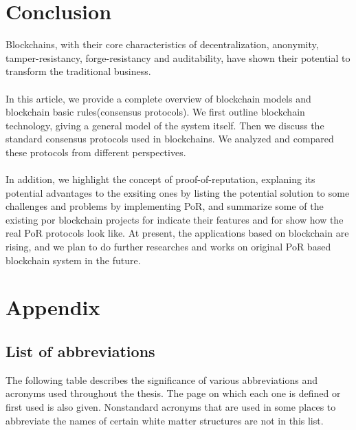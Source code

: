 \documentclass[doublespacing]{bmcart}
\begin{document}
\begin{CJK*}{UTF8}{gbsn}
	\section{Conclusion}
	Blockchains, with their core characteristics of decentralization, anonymity, tamper-resistancy, forge-resistancy and auditability, have shown their potential to transform the traditional business. 
	\paragraph{}	
	In this article, we provide a complete overview of blockchain models and blockchain basic rules(consensus protocols). We first outline blockchain technology, giving a general model of the system itself. Then we discuss the standard consensus protocols used in blockchains. We analyzed and compared these protocols from different perspectives. 
	\paragraph{}
	In addition, we highlight the concept of proof-of-reputation, explaning its potential advantages to the exsiting ones by listing the potential solution to some challenges and problems by implementing PoR, and summarize some of the existing por blockchain projects for indicate their features and for show how the real PoR protocols look like. At present, the applications based on blockchain are rising, and we plan to do further researches and works on original PoR based blockchain system in the future.
	
\section*{Appendix}
\subsection*{List of abbreviations}
The following table describes the significance of various abbreviations and acronyms used throughout the thesis. The page on which each one is defined or first used is also given. Nonstandard acronyms that are used in some places to abbreviate the names of certain white matter structures are not in this list.


\end{CJK*}
\end{document}
